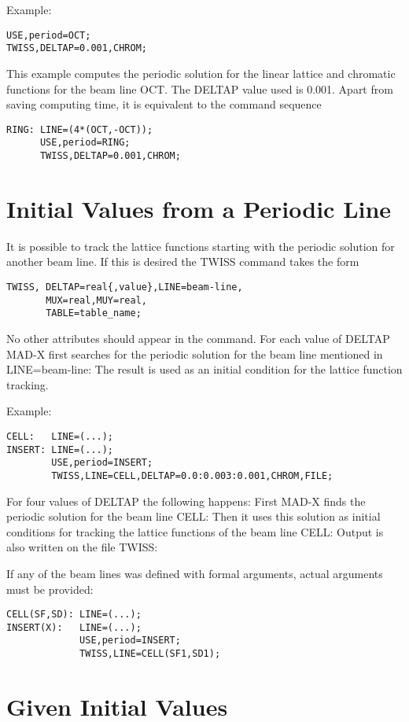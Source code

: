 Example: 
\begin{verbatim}
USE,period=OCT;
TWISS,DELTAP=0.001,CHROM;
\end{verbatim}

This example computes the periodic solution for the linear lattice and
chromatic functions for the beam line OCT. The DELTAP value used is
0.001. Apart from saving computing time, it is equivalent to the command
sequence  
\begin{verbatim}
RING: LINE=(4*(OCT,-OCT));
      USE,period=RING;
      TWISS,DELTAP=0.001,CHROM;
\end{verbatim}

\section{Initial Values from a Periodic Line}

It is possible to track the lattice functions starting with the periodic
solution for another beam line. If this is desired the TWISS command
takes the form  
\begin{verbatim}
TWISS, DELTAP=real{,value},LINE=beam-line,
       MUX=real,MUY=real,
       TABLE=table_name;
\end{verbatim}

No other attributes should appear in the command. For each value of
DELTAP MAD-X first searches for the periodic solution for the beam line
mentioned in LINE=beam-line: The result is used as an initial condition
for the lattice function tracking. 

Example: 
\begin{verbatim}
CELL:   LINE=(...);
INSERT: LINE=(...);
        USE,period=INSERT;
        TWISS,LINE=CELL,DELTAP=0.0:0.003:0.001,CHROM,FILE;
\end{verbatim}

For four values of DELTAP the following happens: First MAD-X finds the
periodic solution for the beam line CELL: Then it uses this solution as
initial conditions for tracking the lattice functions of the beam line
CELL: Output is also written on the file TWISS:  

If any of the beam lines was defined with formal arguments, actual
arguments must be provided:  
\begin{verbatim}
CELL(SF,SD): LINE=(...);
INSERT(X):   LINE=(...);
             USE,period=INSERT;
             TWISS,LINE=CELL(SF1,SD1);
\end{verbatim}

\section{Given Initial Values}

